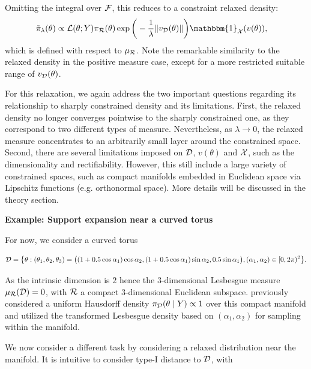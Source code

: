 \documentclass[10pt,fleqn]{article}
\DeclareMathOperator{\1}{\mathbbm{1}} \DeclareMathOperator{\bigO}{\mc O}
\begin{document}
{Omitting the integral over
$\mathcal{F}$, this reduces to a constraint relaxed density:
\begin{equation}
\begin{split}
\label{EQ:relaxedDensityZeroMeasure}
\tilde{\pi}_\lambda(\theta)  & \propto \mathcal{L}(\theta;Y)
\pi_\mathcal{R}(\theta)\exp\bigg(-\frac{1}{\lambda}\|v_\mathcal{D}(\theta)\|\bigg)
\mathbbm{1}_{\mc X}(v(\theta)),
\end{split}
\end{equation}
which is defined with respect to $\mu_{\mathcal{R}}$. Note the remarkable similarity to the relaxed density in the positive measure case, except for a more restricted suitable range of  $v_{\mathcal{D}}(\theta)$.

For this relaxation, we again address the two important questions regarding its relationship to sharply constrained density and its limitations. First, the relaxed density no longer converges pointwise to the sharply constrained one, as they correspond to two different types of measure. Nevertheless, as $\lambda\to 0$, the relaxed measure concentrates to an arbitrarily small layer around the constrained space. Second, there are several limitations imposed on $\mathcal{D}$, $v(\theta)$ and $\mathcal{X}$, such as the dimensionality and rectifiability. However, this still include a large variety of constrained spaces, such as compact manifolds embedded in Euclidean space via Lipschitz functions (e.g. orthonormal space).
 More details will be discussed in the theory section. 

\textbf{Example: Support expansion near a curved torus}


For now, we consider a curved torus

$$\mathcal{D}= \big\{\theta: (\theta_1,\theta_2,\theta_3) = \big(
(1+ 0.5 \cos\alpha_1) \cos\alpha_2, (1+ 0.5\cos\alpha_1) \sin\alpha_2,0.5 \sin\alpha_1\big), (\alpha_1,\alpha_2)\in [0,2\pi)^2 \big\}.$$ 

As the intrinsic dimension is $2$ hence
 the $3$-dimensional Lesbesgue measure $\mu_{\mathcal{R}}(\mathcal{D})=0$, with  $\mathcal{R}$ a compact $3$-dimensional Euclidean subspace. \cite{diaconis2013manifold} previously considered a uniform Hausdorff density $\pi_{\mathcal{D} }(\theta \mid Y) \propto 1$ over this compact manifold and utilized the transformed Lesbesgue density based on $(\alpha_1,\alpha_2)$ for sampling within the manifold.

We now consider a different task by considering a relaxed distribution near the manifold. It is intuitive to consider type-I distance to $\mathcal{D}$, with

}
\end{document}
